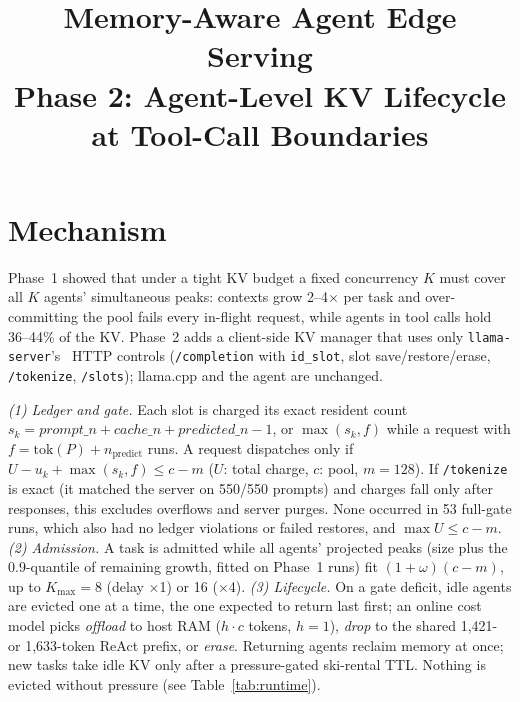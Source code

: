 \documentclass[conference]{IEEEtran}
\newcommand{\K}{$K$}
\newcommand{\x}{$\times$}
\begin{document}
\title{Memory-Aware Agent Edge Serving\\
\large Phase 2: Agent-Level KV Lifecycle at Tool-Call Boundaries}

\author{
}

\maketitle

\section{Mechanism}

Phase~1 showed that under a tight KV budget a fixed concurrency \K{} must cover all \K{} agents'
simultaneous peaks: contexts grow 2--4\x{} per task and over-committing the pool fails every
in-flight request, while agents in tool calls hold 36--44\% of the KV. Phase~2 adds a client-side
KV manager that uses only \texttt{llama-server}'s~\cite{llamacpp} HTTP controls (\texttt{/completion}
with \texttt{id\_slot}, slot save/restore/erase, \texttt{/tokenize},
\texttt{/slots}); llama.cpp and the agent are unchanged.

\emph{(1) Ledger and gate.} Each slot is charged its exact resident count
$s_k=\mathit{prompt\_n}+\mathit{cache\_n}+\mathit{predicted\_n}-1$, or $\max(s_k,f)$ while a request
with $f=\mathrm{tok}(P)+n_\mathrm{predict}$ runs. A request dispatches only if
$U-u_k+\max(s_k,f)\le c-m$ ($U$: total charge, $c$: pool, $m=128$). If \texttt{/tokenize} is exact
(it matched the server on 550/550 prompts) and charges fall only after responses, this excludes
overflows and server purges. None occurred in 53 full-gate runs, which also had no ledger
violations or failed restores, and $\max U\le c-m$.
\emph{(2) Admission.} A task is admitted while all agents' projected peaks (size plus the
0.9-quantile of remaining growth, fitted on Phase~1 runs) fit $(1+\omega)(c-m)$, up to
$K_\mathrm{max}=8$ (delay \x1) or 16 (\x4).
\emph{(3) Lifecycle.} On a gate deficit, idle agents are
evicted one at a time, the one expected to return last first; an online cost model picks
\emph{offload} to host RAM ($h\cdot c$ tokens, $h=1$), \emph{drop} to the shared 1,421- or
1,633-token ReAct prefix, or \emph{erase}. Returning agents reclaim memory at once; new tasks take
idle KV only after a pressure-gated ski-rental TTL. Nothing is evicted without pressure
(see Table~\ref{tab:runtime}).
\end{document}
